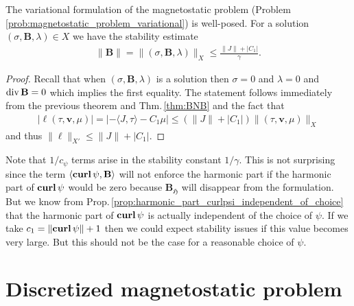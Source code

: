 \documentclass[../master_thesis.tex]{subfiles}
\begin{document}
\begin{corollary}
    The variational formulation of the magnetostatic problem 
    {\normalfont (Problem\,\ref{prob:magnetostatic_problem_variational})} is well-posed. 
    For a solution $(\sigma, \mathbf{B},\lambda) \in X$
    we have the stability estimate 
    \begin{align*}
        \lVert \mathbf{B} \rVert  = \lVert (\sigma, \mathbf{B}, \lambda )\rVert _X 
        \leq \frac{\lVert J \rVert + |C_1|}{\gamma}.
    \end{align*}
\end{corollary}
\begin{proof}
    Recall that when $(\sigma, \mathbf{B},\lambda)$ is a solution 
    then $\sigma = 0$ and $\lambda = 0$ and $\operatorname{div} \mathbf{B}=0$ which implies the 
    first equality.
    The statement follows immediately from the previous theorem and 
    Thm.\,\ref{thm:BNB} and the fact that 
    \begin{align*}
        | \ell(\tau,\mathbf{v},\mu) |
        = | - \langle J, \tau \rangle - C_1 \mu | 
        \leq (\lVert J \rVert + | C_1 |) \lVert (\tau,\mathbf{v},\mu) \rVert _X
    \end{align*}
    and thus $\lVert \ell \rVert _{X'} \leq \lVert J \rVert + | C_1 |$.
\end{proof}

\begin{remark}
    Note that $1/c_\psi$ terms arise
    in the stability constant $1/\gamma$. This is not surprising since the term 
    $\langle \veccurl \psi, \mathbf{B} \rangle$ will not enforce the harmonic 
    part if the harmonic part of $\veccurl \psi$ would be zero because 
    $\mathbf{B}_\mathfrak{H}$ will disappear from the formulation. But we know from 
    Prop.\,\ref{prop:harmonic_part_curlpsi_independent_of_choice} 
    that the harmonic part of $\veccurl \psi$ is actually independent of 
    the choice of $\psi$. If we take $c_1 = \lVert \veccurl \psi \rVert + 1$ then
    we could expect stability issues if this value becomes very large. But this 
    should not be the case for a reasonable choice of $\psi$.
\end{remark}

\section{Discretized magnetostatic problem}\label{sec:discretized_magnetostatic_problem}
\end{document}
